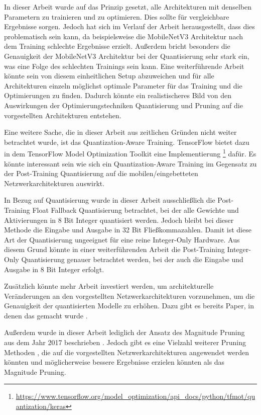 In dieser Arbeit wurde auf das Prinzip gesetzt, alle Architekturen mit denselben Parametern zu trainieren und zu optimieren. Dies sollte für vergleichbare Ergebnisse sorgen. Jedoch hat sich im Verlauf der Arbeit herausgestellt, dass dies problematisch sein kann, da beispielsweise die MobileNetV3 Architektur nach dem Training schlechte Ergebnisse erzielt. Außerdem bricht besonders die Genauigkeit der MobileNetV3 Architektur bei der Quantisierung sehr stark ein, was eine Folge des schlechten Trainings sein kann. Eine weiterführende Arbeit könnte sein von diesem einheitlichen Setup abzuweichen und für alle Architekturen einzeln möglichst optimale Parameter für das Training und die Optimierungen zu finden. Dadurch könnte ein realistischeres Bild von den Auswirkungen der Optimierungstechniken Quantisierung und Pruning auf die vorgestellten Architekturen entstehen.

Eine weitere Sache, die in dieser Arbeit aus zeitlichen Gründen nicht weiter betrachtet wurde, ist das Quantization-Aware Training. TensorFlow bietet dazu in dem TensorFlow Model Optimization Toolkit eine Implementierung \footnote{\url{https://www.tensorflow.org/model_optimization/api_docs/python/tfmot/quantization/keras}} dafür. Es könnte interessant sein wie sich ein Quantization-Aware Training im Gegensatz zu der Post-Training Quantisierung auf die mobilen/eingebetteten Netzwerkarchitekturen auswirkt. 

In Bezug auf Quantisierung wurde in dieser Arbeit ausschließlich die Post-Training Float Fallback Quantisierung betrachtet, bei der alle Gewichte und Aktivierungen in 8 Bit Integer quantisiert werden. Jedoch bleibt bei dieser Methode die Eingabe und Ausgabe in 32 Bit Fließkommazahlen. Damit ist diese Art der Quantisierung ungeeignet für eine reine Integer-Only Hardware. Aus diesem Grund könnte in einer weiterführenden Arbeit die Post-Training Integer-Only Quantisierung genauer betrachtet werden, bei der auch die Eingabe und Ausgabe in 8 Bit Integer erfolgt.

Zusätzlich könnte mehr Arbeit investiert werden, um architekturelle Veränderungen an den vorgestellten Netzwerkarchitekturen vorzunehmen, um die Genauigkeit der quantisierten Modelle zu erhöhen. Dazu gibt es bereits Paper, in denen das gemacht wurde \cite{sheng_quantization-friendly_2018}.

Außerdem wurde in dieser Arbeit lediglich der Ansatz des Magnitude Pruning aus dem Jahr 2017 beschrieben \cite{zhu_prune_2017}. Jedoch gibt es eine Vielzahl weiterer Pruning Methoden \cite{gale_state_2019, mishra_survey_2020, tu_pruning_2020}, die auf die vorgestellten Netzwerkarchitekturen angewendet werden könnten und möglicherweise bessere Ergebnisse erzielen könnten als das Magnitude Pruning.
